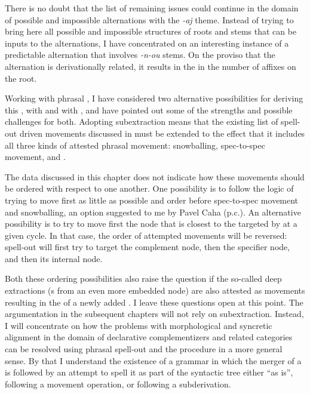 There is no doubt that the list of remaining issues could continue in the domain of possible and impossible  alternations with the \textit{-aj} theme.  Instead of trying to bring here all possible and impossible structures of roots and stems that can be inputs to the alternations, I have concentrated on an interesting instance of a predictable alternation that involves \textit{-n-ou} stems. On the proviso that the alternation is derivationally related, it results in the  in the number of affixes on the root.
\par
Working with phrasal , I have considered two alternative possibilities for deriving this , with  and with , and have pointed out some of the strengths and possible challenges for both. Adopting subextraction means that the existing list of spell-out driven movements discussed in \cite{Starke2018} must be extended to the effect that it includes all
three kinds of attested phrasal movement: snowballing, spec-to-spec movement, and .
\par
The data discussed in this chapter does not indicate how these  movements should be ordered with respect to one another. One possibility is to follow the logic of trying to move first as little as possible and order  before spec-to-spec movement and snowballing, an option suggested to me by  Pavel Caha (p.c.). An alternative possibility is to try to move first the node that is closest to the  targeted by  at a given cycle. In that case, the order of attempted movements will be reversed: spell-out will first try to target the complement node, then the specifier node, and then its internal node.
\par
 Both these ordering possibilities also raise the question if the so-called deep extractions (s from an even more embedded node) are also attested as movements resulting in the  of a newly added . I leave these questions open at this point.
The argumentation in the subsequent chapters will not rely on subextraction. Instead,
I will concentrate on how the problems with morphological  and syncretic alignment in the domain of declarative complementizers and related categories can be resolved using phrasal spell-out and the  procedure in a more general sense.  By that I understand the existence of a grammar in which the merger of a  is followed by an attempt to spell it as part of the syntactic tree either ``as is'', following a movement operation, or following a subderivation.

   
 
 
 
